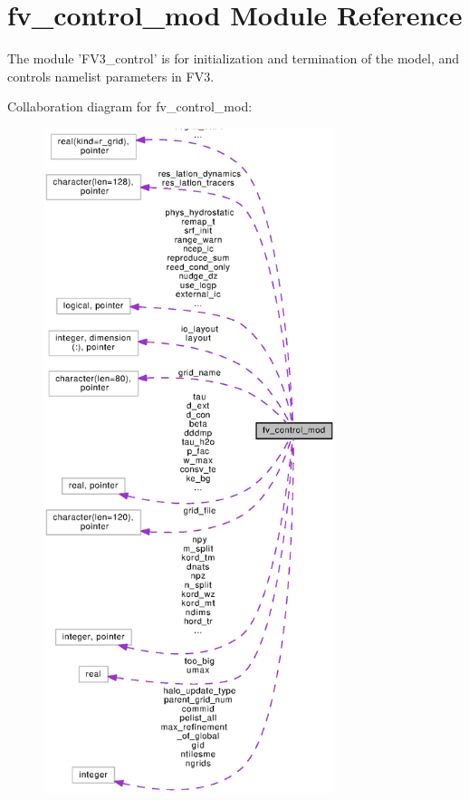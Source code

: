 \section{fv\-\_\-control\-\_\-mod Module Reference}
\label{classfv__control__mod}


The module 'F\-V3\-\_\-control' is for initialization and termination of the model, and controls namelist parameters in F\-V3.  




Collaboration diagram for fv\-\_\-control\-\_\-mod\-:
\nopagebreak
\begin{figure}[H]
\begin{center}
\leavevmode
\includegraphics[height=550pt]{classfv__control__mod__coll__graph}
\end{center}
\end{figure}
